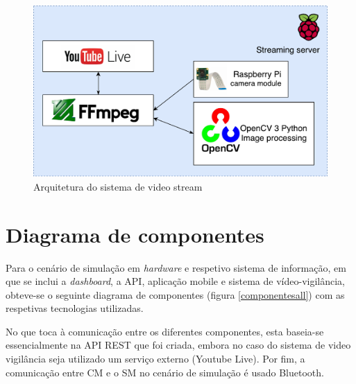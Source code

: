 


\begin{figure}[h]
	\centering
	\includegraphics[scale = 0.5]{esquemas/videostream.pdf}
	\caption{Arquitetura do sistema de video stream}
	\label{arquiteturavisao}
\end{figure}







\section{Diagrama de componentes}

Para o cenário de simulação em \textit{hardware} e respetivo sistema de informação, em que se inclui a \textit{dashboard}, a \ac{API}, aplicação mobile e sistema de vídeo-vigilância, obteve-se o seguinte diagrama de componentes (figura \ref{componentesall}) com as respetivas tecnologias utilizadas. 

No que toca à comunicação entre os diferentes componentes, esta baseia-se essencialmente na API REST que foi criada, embora no caso do sistema de video vigilância seja utilizado um serviço externo (Youtube Live). Por fim, a comunicação entre \acl{CM} e o \acl{SM} no cenário de simulação é usado Bluetooth. 



